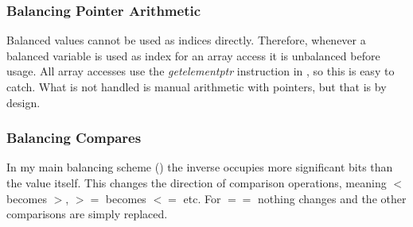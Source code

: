 \subsubsection{Balancing Pointer Arithmetic}
Balanced values cannot be used as indices directly.
Therefore, whenever a balanced variable is used as index for an array access it is unbalanced before usage.
All array accesses use the \emph{getelementptr} instruction in \ir{}, so this is easy to catch.
What is not handled is manual arithmetic with pointers, but that is by design.

\subsubsection{Balancing Compares}
In my main balancing scheme () the inverse occupies more significant bits than the value itself.
This changes the direction of comparison operations, meaning $<$ becomes $>$, $>=$ becomes $<=$ etc.
For $==$ nothing changes and the other comparisons are simply replaced.
